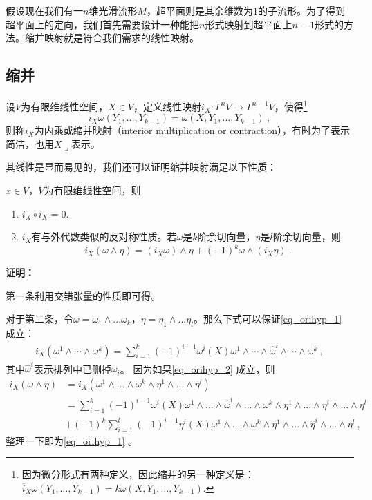 

假设现在我们有一$n$维光滑流形$M$，超平面则是其余维数为1的子流形。为了得到超平面上的定向，我们首先需要设计一种能把$n$形式映射到超平面上$n-1$形式的方法。缩并映射就是符合我们需求的线性映射。

\subsection{缩并}
\begin{definition}{}
设$V$为有限维线性空间，$X\in V$，定义线性映射$i_X:\Gamma^n V\rightarrow\Gamma^{n-1}V$，使得\footnote{因为微分形式有两种定义，因此缩并的另一种定义是：$\overline{i}_X\omega(Y_1,\ldots,Y_{k-1})=k\omega(X,Y_1,\ldots,Y_{k-1}).$}
\begin{equation}
i_X\omega(Y_1,\ldots,Y_{k-1})=\omega(X,Y_1,\ldots,Y_{k-1})~,
\end{equation}
则称$i_X$为内乘或缩并映射（interior multiplication or contraction），有时为了表示简洁，也用$X\lrcorner$表示。
\end{definition}
其线性是显而易见的，我们还可以证明缩并映射满足以下性质：
\begin{lemma}{}
$x\in V$，$V$为有限维线性空间，则
\begin{enumerate}
\item $i_X\circ i_X=0$.
\item $i_X$有与外代数类似的反对称性质。若$\omega$是$k$阶余切向量，$\eta$是$l$阶余切向量，则
\begin{equation}\label{eq_orihyp_1}
i_X(\omega\wedge\eta)=(i_X\omega)\wedge\eta+(-1)^k\omega\wedge(i_X\eta)~.
\end{equation}
\end{enumerate}
\end{lemma}
\textbf{证明：}

第一条利用交错张量的性质即可得。

对于第二条，令$\omega=\omega_1\wedge...\omega_k$，$\eta=\eta_1\wedge...\eta_l$。那么下式可以保证\autoref{eq_orihyp_1} 成立：
\begin{equation}\label{eq_orihyp_2}
\begin{aligned}
i_X(\omega^1\wedge\cdots\wedge\omega^k)=\sum_{i=1}^k(-1)^{i-1}\omega^i(X)\omega^1\wedge\cdots\wedge\hat{\omega}^i\wedge\cdots\wedge\omega^k~,
\end{aligned}
\end{equation}
其中$\hat\omega^i$表示排列中已删掉$\omega_i$。
因为如果\autoref{eq_orihyp_2} 成立，则
\begin{equation}
\begin{aligned}
i_X(\omega\wedge\eta)&=i_X(\omega^1\wedge...\wedge\omega^k\wedge\eta^1\wedge...\wedge\eta^l)\\
&=\sum_{i=1}^k(-1)^{i-1}\omega^{i}(X)\omega^1\wedge...\wedge\hat\omega^i\wedge...\wedge\omega^k\wedge\eta^1\wedge...\wedge\eta^i\wedge...\wedge\eta^l\\
&+(-1)^k\sum_{i=1}^l(-1)^{i-1}\eta^{i}(X)\omega^1\wedge...\wedge\omega^k\wedge\eta^1\wedge...\wedge\hat\eta^i\wedge...\wedge\eta^l~,
\end{aligned}
\end{equation}
整理一下即为\autoref{eq_orihyp_1} 。

